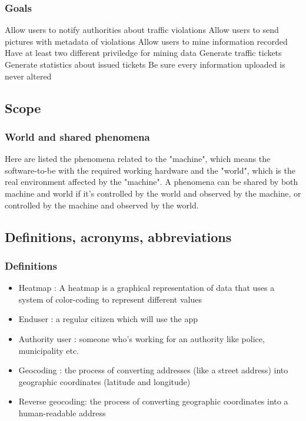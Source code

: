 \subsubsection{Goals}
\begin{enumerate}
   Allow users to notify authorities about traffic violations
   Allow users to send pictures with metadata of violations
   Allow users to mine information recorded
   Have at least two different  priviledge for mining data
   Generate traffic tickets
   Generate statistics about issued tickets
   Be sure every information uploaded is never altered
\end{enumerate}


\subsection{Scope}

\subsubsection{World and shared phenomena}

Here are listed the phenomena related to the "machine", which means the software-to-be with the required working hardware and the "world", which is the real environment affected by the "machine".
A phenomena can be shared by both machine and world if it's controlled by the world and observed by the machine, or controlled by the machine and observed by the world.




\subsection{Definitions,  acronyms,  abbreviations}

\subsubsection{Definitions}
\begin{itemize}
  \item{Heatmap} : A heatmap is a graphical representation of data that uses a system of color-coding to represent different values
  \item Enduser : a regular citizen which will use the app
  \item Authority user : someone who's working for an authority like police, municipality etc.
  \item Geocoding : the process of converting addresses (like a street address) into geographic coordinates (latitude and longitude)
  \item Reverse geocoding:  the process of converting geographic coordinates into a human-readable address

\end{itemize}


